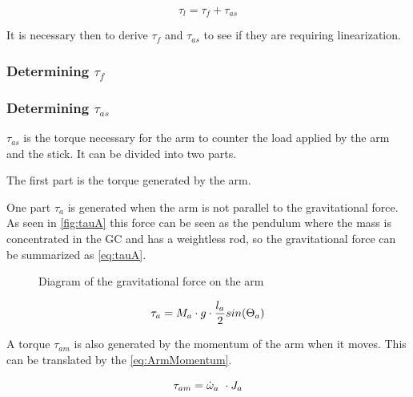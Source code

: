 \begin{equation}\label{eq:TauL}
	\tau_l = \tau_f + \tau_{as}
\end{equation}

It is necessary then to derive $\tau_f$ and $\tau_{as}$ to see if they are requiring linearization.

\subsubsection*{Determining $\tau_{f}$}

\subsubsection*{Determining $\tau_{as}$}

$\tau_{as}$ is the torque necessary for the arm to counter the load applied by the arm and the stick. It can be divided into two parts.

The first part is the torque generated by the arm.

 One part $\tau_a$ is generated when the arm is not parallel to the gravitational force. As seen in \autoref{fig:tauA} this force can be seen as the pendulum where the mass is concentrated in the GC and has a weightless rod, so the gravitational force can be summarized as \autoref{eq:tauA}.

\begin{figure}[htbp]
	\caption{Diagram of the gravitational force on the arm}\label{fig:tauA}
\end{figure}

\begin{equation}\label{eq:tauA}
	\tau_a=M_a\cdot g \cdot \frac{l_a}{2} sin(\Theta_a) \addunit{\newton\meter}
\end{equation}
\startexplain
{}
\stopexplain

A torque $\tau_{am}$ is also generated by the momentum of the arm when it moves. This can be translated by the \autoref{eq:ArmMomentum}.

\begin{equation}\label{eq:ArmMomentum}
	\tau_{am}=\dot\omega_a\ \cdot J_a \addunit{\newton\meter}
\end{equation}
\startexplain
{}
\stopexplain

